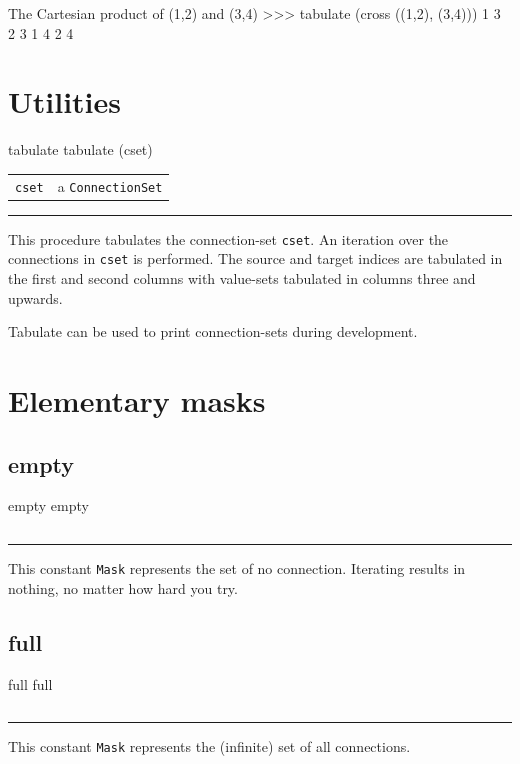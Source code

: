 \documentclass[a4paper,twoside]{report}
\makeatletter
\newenvironment{parameters}%
{\begin{tabular}{@{\hspace{2em}}lp{0.6\textwidth}}}%
{\end{tabular}\par\vspace{1mm}\par\hrule\par\vspace{5mm}}
\newcommand{\cls}[1]{\lstinline|#1|}
\newcommand{\fa}[1]{\lstinline|#1|}
\makeatother
\begin{document}
\begin{code}{The Cartesian product of (1,2) and (3,4)}
>>> tabulate (cross ((1,2), (3,4)))
1 	3
2 	3
1 	4
2 	4
\end{code}

\section{Utilities}

\begin{head}{tabulate}
  tabulate (cset)
\end{head}
\begin{parameters}
  \lstinline|cset| &%
  a \cls{ConnectionSet}\\
\end{parameters}
This procedure tabulates the connection-set \fa{cset}.  An iteration
over the connections in \fa{cset} is performed.  The source and target
indices are tabulated in the first and second columns with value-sets
tabulated in columns three and upwards.

Tabulate can be used to print connection-sets during development.

\section{Elementary masks}

\subsection{empty}

\begin{head}{empty}
  empty
\end{head}
\begin{parameters}
\end{parameters}
This constant \cls{Mask} represents the set of no connection.
Iterating results in nothing, no matter how hard you try.

\subsection{full}

\begin{head}{full}
  full
\end{head}
\begin{parameters}
\end{parameters}
This constant \cls{Mask} represents the (infinite) set of all
connections.
\end{document}
